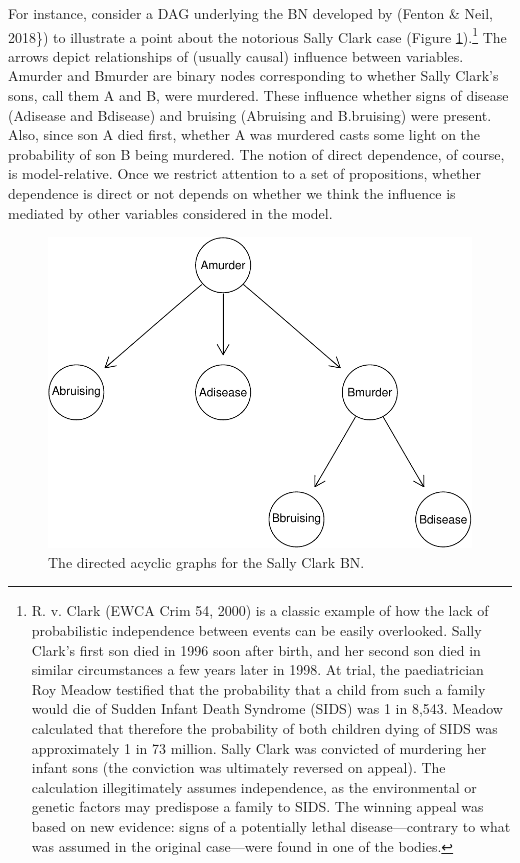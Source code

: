 \documentclass[
  10pt,
]{scrartcl}
\begin{document}
For instance, consider a DAG underlying the BN developed by (Fenton \& Neil, 2018\}) to illustrate a point about the notorious Sally Clark case (Figure \ref{fig:sc}).\footnote{ R. v. Clark (EWCA Crim 54, 2000) is a classic example of how the lack of probabilistic independence between events can be easily overlooked. Sally Clark's first son died in 1996 soon after birth, and her second son died in similar circumstances a few years later in 1998. At trial, the paediatrician Roy Meadow testified that the probability that a child from such a family would die of Sudden Infant Death Syndrome (SIDS) was 1 in 8,543. Meadow calculated that therefore the probability of both children dying of SIDS was approximately 1 in 73 million. Sally Clark was convicted of murdering her infant sons (the conviction was ultimately reversed on appeal). The calculation illegitimately assumes independence, as the environmental or genetic factors may predispose a family to SIDS. The winning appeal was based on new evidence: signs of a potentially lethal disease---contrary to what was assumed in the original case---were found in one of the bodies.} The arrows depict relationships of (usually causal) influence between variables. \textsf{Amurder} and \textsf{Bmurder} are binary nodes corresponding to whether Sally Clark's sons, call them A and B, were murdered. These influence whether signs of disease (\textsf{Adisease} and \textsf{Bdisease}) and bruising (\textsf{Abruising} and \textsf{B.bruising}) were present. Also, since son A died first, whether A was murdered casts some light on the probability of son B being murdered. The notion of direct dependence, of course, is model-relative. Once we restrict attention to a set of propositions, whether dependence is direct or not depends on whether we think the influence is mediated by other variables considered in the model.

\begin{figure}

\begin{center}\includegraphics[width=0.8\linewidth]{coherencePaper40_files/figure-latex/scDAG-1} \end{center}
\caption{The directed acyclic graphs for the Sally Clark BN. }
\label{fig:sc}
\end{figure}
\end{document}
